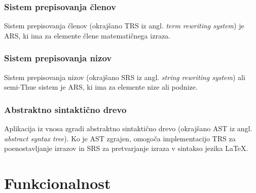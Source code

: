 \documentclass[12pt,titlepage]{report}
\newcommand{\angokr}[2]{(okrajšano #1 iz angl. \emph{#2})}
\begin{document}
		\subsection{Sistem prepisovanja členov}
			Sistem prepisovanja členov \angokr{TRS}{term rewriting system} je ARS, ki ima za elemente člene matematičnega izraza.
		\subsection{Sistem prepisovanja nizov}
			Sistem prepisovanja nizov \angokr{SRS}{string rewriting system} ali semi-Thue sistem je ARS, ki ima za elemente nize ali podnize.
		\subsection{Abstraktno sintaktično drevo}
			Aplikacija iz vnosa zgradi abstraktno sintaktično drevo \angokr{AST}{abstract syntax tree}.
			Ko je AST zgrajen, omogoča implementacijo TRS za poenostavljanje izrazov in SRS za pretvarjanje izraza v sintakso jezika \LaTeX{}.
\chapter{Funkcionalnost}
\label{features}
\end{document}
